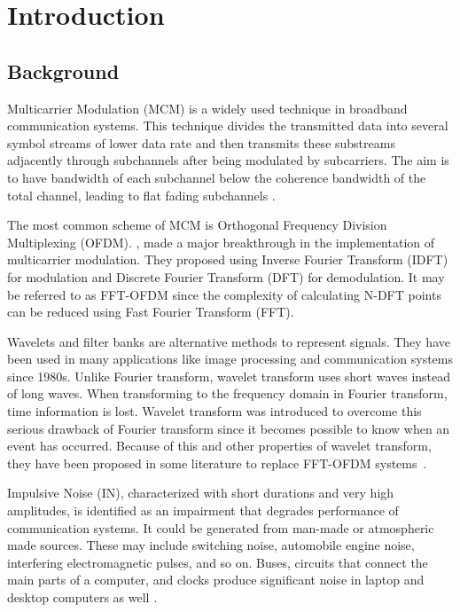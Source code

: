 \chapter{Introduction} \label{chap1}
	\section{Background}
		Multicarrier Modulation (MCM) is a widely used technique in  broadband communication systems. This  technique  divides the transmitted data into several symbol streams of lower data rate and then transmits these substreams adjacently through subchannels  after being modulated by subcarriers. The aim is to have bandwidth of each subchannel below the coherence bandwidth of the total channel, leading to flat fading subchannels \cite{2005-goldsmithBook}.
		\par The most common scheme of MCM is Orthogonal Frequency Division Multiplexing (OFDM).  \citeauthor{1971-weinstein} \citeyear{1971-weinstein}, made a major breakthrough in the implementation of multicarrier modulation. They proposed using Inverse Fourier Transform (IDFT) for modulation and Discrete Fourier Transform (DFT) for demodulation. It may be referred to as FFT-OFDM since the complexity of calculating N-DFT points can be reduced using Fast Fourier Transform (FFT).
		\par Wavelets and filter banks are alternative methods to represent signals. They have been used in many applications like image processing and communication systems since 1980s. Unlike Fourier transform, wavelet transform uses short waves instead of long waves. When transforming to the frequency domain in Fourier transform, time information is lost. Wavelet transform was introduced to overcome this serious drawback of Fourier transform since it becomes possible to know when an event has occurred. Because of this and other properties of wavelet transform, they have been proposed in some literature to replace FFT-OFDM systems~\cite{1996-strang}.
		\par Impulsive Noise (IN), characterized with short durations and very high
		amplitudes, is identified as an impairment that degrades performance of communication systems. It could be generated from  man-made or atmospheric made sources. These may include switching noise, automobile engine noise, interfering electromagnetic pulses, and so on. Buses, circuits that connect the main parts of a computer, and clocks produce significant noise in laptop and desktop computers as well \cite{2011-nassar-mitigating}.
